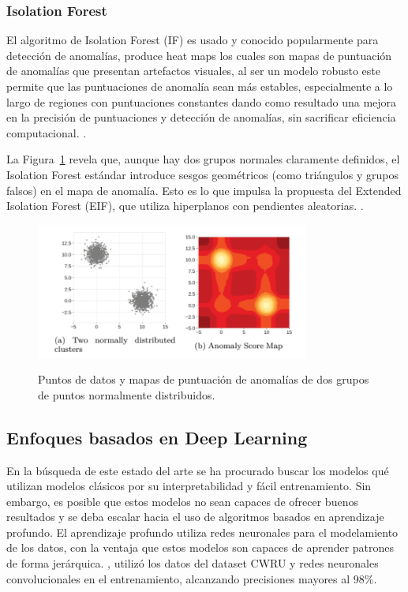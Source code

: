 \documentclass[11pt,a4paper,spanish]{book}
\numberwithin{equation}{chapter}
\numberwithin{figure}{chapter}
\begin{document}
\subsubsection{Isolation Forest}

El algoritmo de Isolation Forest (IF) es usado y conocido popularmente para detección de 
anomalías, produce heat maps los cuales son mapas de puntuación de anomalías que 
presentan artefactos visuales, al ser un modelo robusto este permite que las 
puntuaciones de anomalía sean más estables, especialmente a lo largo de regiones con 
puntuaciones constantes dando como resultado una mejora en la precisión de puntuaciones 
y detección de anomalías, sin sacrificar eficiencia computacional. 
\cite{liu2021isoletionforest}.

La Figura~\ref{fig:figIsolationForest} revela que, aunque hay dos grupos normales 
claramente definidos, el Isolation Forest estándar introduce sesgos geométricos 
(como triángulos y grupos falsos) en el mapa de anomalía. Esto es lo que impulsa la 
propuesta del Extended Isolation Forest (EIF), que utiliza hiperplanos con pendientes 
aleatorias. \cite{liu2021isoletionforest}.


\begin{figure}[H]
	\caption{Puntos de datos y mapas de puntuación de anomalías de dos grupos de puntos 
    normalmente distribuidos.  \protect\cite{liu2021isoletionforest} }
    \centering
    \includegraphics[width=0.8\textwidth]{media/liu-isolation-forest.png}
    \label{fig:figIsolationForest}
\end{figure}




\subsection{Enfoques basados en Deep Learning}

En la búsqueda de este estado del arte se ha procurado buscar los modelos qué utilizan 
modelos clásicos por su interpretabilidad y fácil entrenamiento. Sin embargo, es posible 
que estos modelos no sean capaces de ofrecer buenos resultados y se deba escalar hacia 
el uso de algoritmos basados en aprendizaje profundo. El aprendizaje profundo utiliza 
redes neuronales para el modelamiento de los datos, con la ventaja que estos modelos 
son capaces de aprender patrones de forma jerárquica. \cite{raj2024bearing}, utilizó 
los datos del dataset CWRU y redes neuronales convolucionales en el entrenamiento, 
alcanzando precisiones mayores al 98\%.
\end{document}
